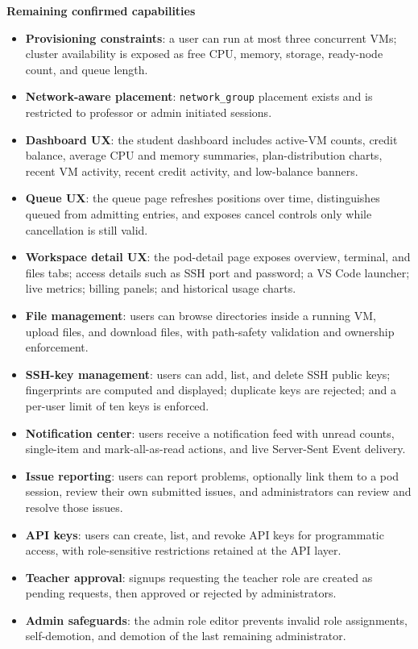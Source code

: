 \documentclass[12pt,a4paper]{article}
\begin{document}
\textbf{Remaining confirmed capabilities}
\begin{itemize}[leftmargin=*]
    \item \textbf{Provisioning constraints}: a user can run at most three concurrent VMs; cluster availability is exposed as free CPU, memory, storage, ready-node count, and queue length.
    \item \textbf{Network-aware placement}: \texttt{network\_group} placement exists and is restricted to professor or admin initiated sessions.
    \item \textbf{Dashboard UX}: the student dashboard includes active-VM counts, credit balance, average CPU and memory summaries, plan-distribution charts, recent VM activity, recent credit activity, and low-balance banners.
    \item \textbf{Queue UX}: the queue page refreshes positions over time, distinguishes queued from admitting entries, and exposes cancel controls only while cancellation is still valid.
    \item \textbf{Workspace detail UX}: the pod-detail page exposes overview, terminal, and files tabs; access details such as SSH port and password; a VS Code launcher; live metrics; billing panels; and historical usage charts.
    \item \textbf{File management}: users can browse directories inside a running VM, upload files, and download files, with path-safety validation and ownership enforcement.
    \item \textbf{SSH-key management}: users can add, list, and delete SSH public keys; fingerprints are computed and displayed; duplicate keys are rejected; and a per-user limit of ten keys is enforced.
    \item \textbf{Notification center}: users receive a notification feed with unread counts, single-item and mark-all-as-read actions, and live Server-Sent Event delivery.
    \item \textbf{Issue reporting}: users can report problems, optionally link them to a pod session, review their own submitted issues, and administrators can review and resolve those issues.
    \item \textbf{API keys}: users can create, list, and revoke API keys for programmatic access, with role-sensitive restrictions retained at the API layer.
    \item \textbf{Teacher approval}: signups requesting the teacher role are created as pending requests, then approved or rejected by administrators.
    \item \textbf{Admin safeguards}: the admin role editor prevents invalid role assignments, self-demotion, and demotion of the last remaining administrator.

\end{itemize}
\end{document}
